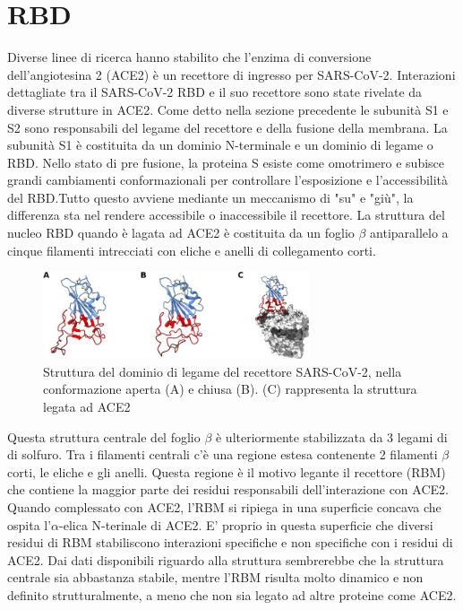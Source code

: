 \section{RBD}\label{sec:cap_sec_subsec}
Diverse linee di ricerca hanno stabilito che l'enzima di conversione dell'angiotesina 2 (ACE2) è un recettore di ingresso per SARS-CoV-2. Interazioni dettagliate tra il SARS-CoV-2 RBD e il suo recettore sono state rivelate da diverse strutture in ACE2. Come detto nella sezione precedente le subunità S1 e S2 sono responsabili del legame del recettore e della fusione della membrana. La subunità S1 è costituita da un dominio N-terminale e un dominio di legame o RBD. Nello stato di pre fusione, la proteina S esiste come omotrimero e subisce grandi cambiamenti conformazionali per controllare l'esposizione e l'accessibilità del RBD.Tutto questo avviene mediante un meccanismo di "su" e "giù", la differenza sta nel rendere accessibile o inaccessibile il recettore. La struttura del nucleo RBD quando è lagata ad ACE2 è costituita da un foglio $\beta$ antiparallelo a cinque filamenti intrecciati con eliche e anelli di collegamento corti. 
\begin{figure}
	\centering
	\includegraphics[width=0.7\textwidth]{Immagini/RBD_structure.png}
	\caption{Struttura del dominio di legame del recettore SARS-CoV-2, nella conformazione aperta (A) e chiusa (B). (C) rappresenta la struttura legata ad ACE2}
	\label{fig:RBDstructure}
\end{figure}

Questa struttura centrale del foglio $\beta$ è ulteriormente stabilizzata da 3 legami di di solfuro. Tra i filamenti centrali c'è una regione estesa contenente 2 filamenti $\beta$ corti, le eliche e gli anelli. Questa regione è il motivo legante il recettore (RBM) che contiene la maggior parte dei residui responsabili dell'interazione con ACE2. Quando complessato con ACE2, l'RBM si ripiega in una superficie concava che ospita l'$\alpha$-elica N-terinale di ACE2. E' proprio in questa superficie che diversi residui di RBM stabiliscono interazioni specifiche e non specifiche con i residui di ACE2. Dai dati disponibili riguardo alla struttura sembrerebbe che la struttura centrale sia abbastanza stabile, mentre l'RBM risulta molto dinamico e non definito strutturalmente, a meno che non sia legato ad altre proteine come ACE2. 

